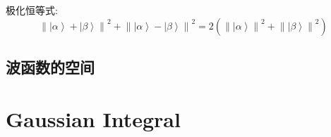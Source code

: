 极化恒等式:
\[{\left\| {\left| \alpha  \right\rangle  + \left| \beta  \right\rangle } \right\|^2} + {\left\| {\left| \alpha  \right\rangle  - \left| \beta  \right\rangle } \right\|^2} = 2\left( {{{\left\| {\left| \alpha  \right\rangle } \right\|}^2} + {{\left\| {\left| \beta  \right\rangle } \right\|}^2}} \right)\]
\section{波函数的空间}

















































\chapter{Gaussian Integral}
